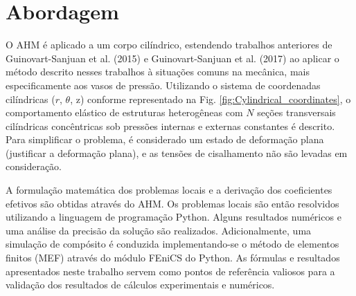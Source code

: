 \section{Abordagem}
O AHM é aplicado a um corpo cilíndrico, estendendo trabalhos anteriores de Guinovart-Sanjuan et al. (2015) e Guinovart-Sanjuan et al. (2017) ao aplicar o método descrito nesses trabalhos à situações comuns na mecânica, mais especificamente aos vasos de pressão. Utilizando o sistema de coordenadas cilíndricas ($r$, $\theta$, z) {conforme representado na Fig. \ref{fig:Cylindrical_coordinates}}, o comportamento elástico de estruturas heterogêneas com $N$ seções transversais cilíndricas concêntricas sob pressões internas e externas constantes é descrito. Para simplificar o problema, é considerado um estado de deformação plana (justificar a deformação plana), e as tensões de cisalhamento não são levadas em consideração.

A formulação matemática dos problemas locais e a derivação dos coeficientes efetivos são obtidas através do AHM. Os problemas locais são então resolvidos utilizando a linguagem de programação Python. Alguns resultados numéricos e uma análise da precisão da solução são realizados. Adicionalmente, uma simulação de compósito é conduzida implementando-se o método de elementos finitos (MEF) através do módulo FEniCS do Python. As fórmulas e resultados apresentados neste trabalho servem como pontos de referência valiosos para a validação dos resultados de cálculos experimentais e numéricos.



